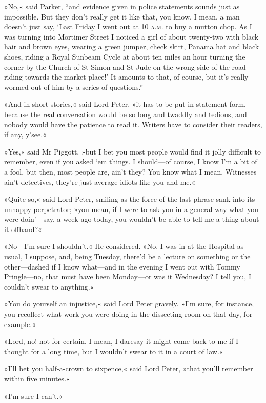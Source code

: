 »No,« said Parker, \enquote{and evidence given in police statements sounds just as impossible. But they don't really get it like that, you know. I mean, a man doesn't just say, \enquote{Last Friday I went out at 10 \textsc{a.m.} to buy a mutton chop. As I was turning into Mortimer Street I noticed a girl of about twenty-two with black hair and brown eyes, wearing a green jumper, check skirt, Panama hat and black shoes, riding a Royal Sunbeam Cycle at about ten miles an hour turning the corner by the Church of St Simon and St Jude on the wrong side of the road riding towards the market place!} It amounts to that, of course, but it's really wormed out of him by a series of questions.}

»And in short stories,« said Lord Peter, »it has to be put in statement form, because the real conversation would be so long and twaddly and tedious, and nobody would have the patience to read it. Writers have to consider their readers, if any, y'see.«

»Yes,« said Mr Piggott, »but I bet you most people would find it jolly difficult to remember, even if you asked `em things. I should—of course, I know I'm a bit of a fool, but then, most people are, ain't they? You know what I mean. Witnesses ain't detectives, they're just average idiots like you and me.«

»Quite so,« said Lord Peter, smiling as the force of the last phrase sank into its unhappy perpetrator; »you mean, if I were to ask you in a general way what you were doin'---say, a week ago today, you wouldn't be able to tell me a thing about it offhand?«

»No—I'm sure I shouldn't.« He considered. »No. I was in at the Hospital as usual, I suppose, and, being Tuesday, there'd be a lecture on something or the other—dashed if I know what—and in the evening I went out with Tommy Pringle—no, that must have been Monday—or was it Wednesday? I tell you, I couldn't swear to anything.«

»You do yourself an injustice,« said Lord Peter gravely. »I'm sure, for instance, you recollect what work you were doing in the dissecting-room on that day, for example.«

»Lord, no! not for certain. I mean, I daresay it might come back to me if I thought for a long time, but I wouldn't swear to it in a court of law.«

»I'll bet you half-a-crown to sixpence,« said Lord Peter, »that you'll remember within five minutes.«

»I'm sure I can't.«

